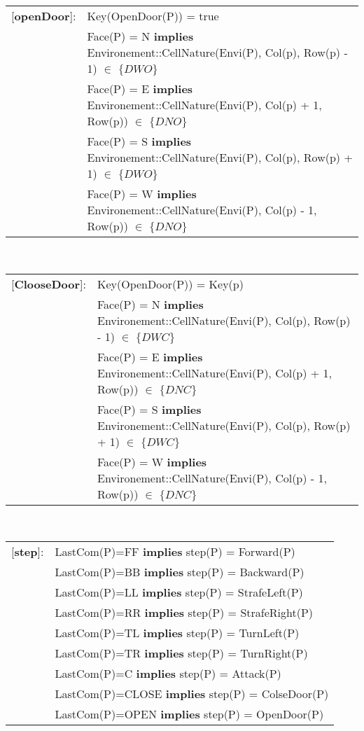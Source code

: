 \begin{tabular}{rl} 
[\textbf{openDoor}]: & Key(OpenDoor(P)) = true\\
&
Face(P) = N \textbf{implies} Environement::CellNature(Envi(P), Col(p), Row(p) - 1) $\in$ $\{ DWO\}$ \\
&
Face(P) = E \textbf{implies} Environement::CellNature(Envi(P), Col(p) + 1, Row(p)) $\in$ $\{ DNO\}$ \\
&
Face(P) = S \textbf{implies} Environement::CellNature(Envi(P), Col(p), Row(p) + 1) $\in$ $\{ DWO\}$ \\
&

Face(P) = W \textbf{implies} Environement::CellNature(Envi(P), Col(p) - 1, Row(p)) $\in$ $\{ DNO\}$
\end{tabular}\\
[0.5cm]
\begin{tabular}{rl}
[\textbf{ClooseDoor}]: & Key(OpenDoor(P)) = Key(p) \\
&
Face(P) = N \textbf{implies} Environement::CellNature(Envi(P), Col(p), Row(p) - 1) $\in$ $\{ DWC\}$ \\
&
Face(P) = E \textbf{implies} Environement::CellNature(Envi(P), Col(p) + 1, Row(p)) $\in$ $\{ DNC\}$ \\
&
Face(P) = S \textbf{implies} Environement::CellNature(Envi(P), Col(p), Row(p) + 1) $\in$ $\{ DWC\}$ \\
&
Face(P) = W \textbf{implies} Environement::CellNature(Envi(P), Col(p) - 1, Row(p)) $\in$ $\{ DNC\}$
\end{tabular}\\
[0.5cm]
\begin{tabular}{rl}
[\textbf{step}]: &
\quad LastCom(P)=FF \textbf{implies} step(P) = Forward(P) \\
& 
\quad LastCom(P)=BB \textbf{implies} step(P) = Backward(P)\\
&
\quad LastCom(P)=LL \textbf{implies} step(P) = StrafeLeft(P)\\
&
\quad LastCom(P)=RR \textbf{implies} step(P) = StrafeRight(P)\\
&
\quad LastCom(P)=TL \textbf{implies} step(P) = TurnLeft(P)\\
&
\quad LastCom(P)=TR \textbf{implies} step(P) = TurnRight(P)\\
&
\quad LastCom(P)=C \textbf{implies} step(P) = Attack(P) \\
&
\quad LastCom(P)=CLOSE \textbf{implies} step(P) = ColseDoor(P)\\
&
\quad LastCom(P)=OPEN \textbf{implies} step(P) = OpenDoor(P)
\end{tabular}
